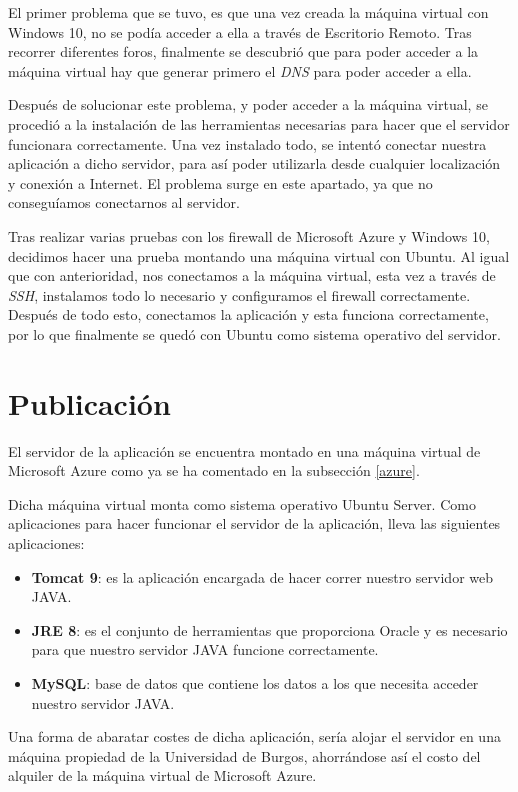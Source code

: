 El primer problema que se tuvo, es que una vez creada la máquina virtual con Windows 10, no se podía acceder a ella a través de Escritorio Remoto. Tras recorrer diferentes foros, finalmente se descubrió que para poder acceder a la máquina virtual hay que generar primero el \textit{DNS} para poder acceder a ella.

Después de solucionar este problema, y poder acceder a la máquina virtual, se procedió a la instalación de las herramientas necesarias para hacer que el servidor funcionara correctamente. Una vez instalado todo, se intentó conectar nuestra aplicación a dicho servidor, para así poder utilizarla desde cualquier localización y conexión a Internet. El problema surge en este apartado, ya que no conseguíamos conectarnos al servidor.

Tras realizar varias pruebas con los firewall de Microsoft Azure y Windows 10, decidimos hacer una prueba montando una máquina virtual con Ubuntu. Al igual que con anterioridad, nos conectamos a la máquina virtual, esta vez a través de \textit{SSH}, instalamos todo lo necesario y configuramos el firewall correctamente. Después de todo esto, conectamos la aplicación y esta funciona correctamente, por lo que finalmente se quedó con Ubuntu como sistema operativo del servidor.

\section{Publicación}

El servidor de la aplicación se encuentra montado en una máquina virtual de Microsoft Azure como ya se ha comentado en la subsección \ref{azure}.

Dicha máquina virtual monta como sistema operativo Ubuntu Server. Como aplicaciones para hacer funcionar el servidor de la aplicación, lleva las siguientes aplicaciones:

\begin{itemize}
	\tightlist
	\item 
	\textbf{Tomcat 9}: es la aplicación encargada de hacer correr nuestro servidor web JAVA.
	\item 
	\textbf{JRE 8}: es el conjunto de herramientas que proporciona Oracle y es necesario para que nuestro servidor JAVA funcione correctamente.
	\item 
	\textbf{MySQL}: base de datos que contiene los datos a los que necesita acceder nuestro servidor JAVA.
\end{itemize}

Una forma de abaratar costes de dicha aplicación, sería alojar el servidor en una máquina propiedad de la Universidad de Burgos, ahorrándose así el costo del alquiler de la máquina virtual de Microsoft Azure.